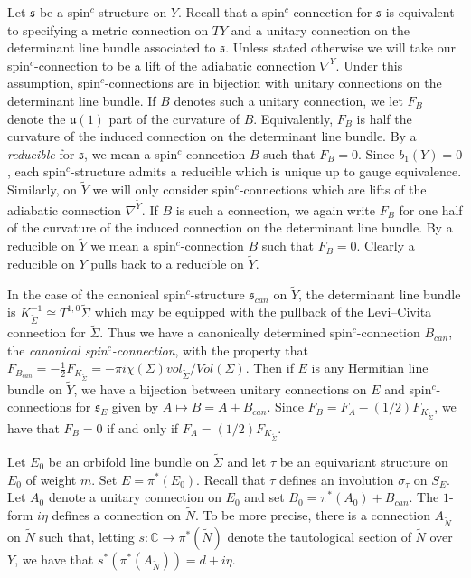 \documentclass{amsart}
\theoremstyle{definition}
\theoremstyle{remark}
\numberwithin{equation}{section}
\begin{document}
Let $\mathfrak{s}$ be a spin$^c$-structure on $Y$. Recall that a spin$^c$-connection for $\mathfrak{s}$ is equivalent to specifying a metric connection on $TY$ and a unitary connection on the determinant line bundle associated to $\mathfrak{s}$. Unless stated otherwise we will take our spin$^c$-connection to be a lift of the adiabatic connection $\nabla^Y$. Under this assumption, spin$^c$-connections are in bijection with unitary connections on the determinant line bundle. If $B$ denotes such a unitary connection, we let $F_B$ denote the $\mathfrak{u}(1)$ part of the curvature of $B$. Equivalently, $F_B$ is half the curvature of the induced connection on the determinant line bundle. By a {\em reducible} for $\mathfrak{s}$, we mean a spin$^c$-connection $B$ such that $F_B = 0$. Since $b_1(Y) = 0$, each spin$^c$-structure admits a reducible which is unique up to gauge equivalence. Similarly, on $\widetilde{Y}$ we will only consider spin$^c$-connections which are lifts of the adiabatic connection $\nabla^{\widetilde{Y}}$. If $B$ is such a connection, we again write $F_B$ for one half of the curvature of the induced connection on the determinant line bundle. By a reducible on $\widetilde{Y}$ we mean a spin$^c$-connection $B$ such that $F_B = 0$. Clearly a reducible on $Y$ pulls back to a reducible on $\widetilde{Y}$.

In the case of the canonical spin$^c$-structure $\mathfrak{s}_{can}$ on $\widetilde{Y}$, the determinant line bundle is $K_{\widetilde{\Sigma}}^{-1} \cong T^{1,0} \widetilde{\Sigma}$ which may be equipped with the pullback of the Levi--Civita connection for $\widetilde{\Sigma}$. Thus we have a canonically determined spin$^c$-connection $B_{can}$, the {\em canonical spin$^c$-connection}, with the property that $F_{B_{can}} = -\frac{1}{2} F_{K_{\widetilde{\Sigma}}} = -\pi i \chi(\Sigma) vol_{\widetilde{\Sigma}}/Vol(\Sigma)$. Then if $E$ is any Hermitian line bundle on $\widetilde{Y}$, we have a bijection between unitary connections on $E$ and spin$^c$-connections for $\mathfrak{s}_E$ given by $A \mapsto B = A + B_{can}$. Since $F_B = F_A - (1/2)F_{K_{\widetilde{\Sigma}}}$, we have that $F_B = 0$ if and only if $F_A = (1/2) F_{K_{\widetilde{\Sigma}}}$.

Let $E_0$ be an orbifold line bundle on $\widetilde{\Sigma}$ and let $\tau$ be an equivariant structure on $E_0$ of weight $m$. Set $E = \pi^*(E_0)$. Recall that $\tau$ defines an involution $\sigma_\tau$ on $S_E$. Let $A_0$ denote a unitary connection on $E_0$ and set $B_0 = \pi^*(A_0) + B_{can}$. The $1$-form $i\eta$ defines a connection on $\widetilde{N}$. To be more precise, there is a connection $A_{\widetilde{N}}$ on $\widetilde{N}$ such that, letting $s : \mathbb{C} \to \pi^*(\widetilde{N})$ denote the tautological section of $\widetilde{N}$ over $Y$, we have that $s^*( \pi^*(A_{\widetilde{N}})) = d + i\eta$.
\end{document}
